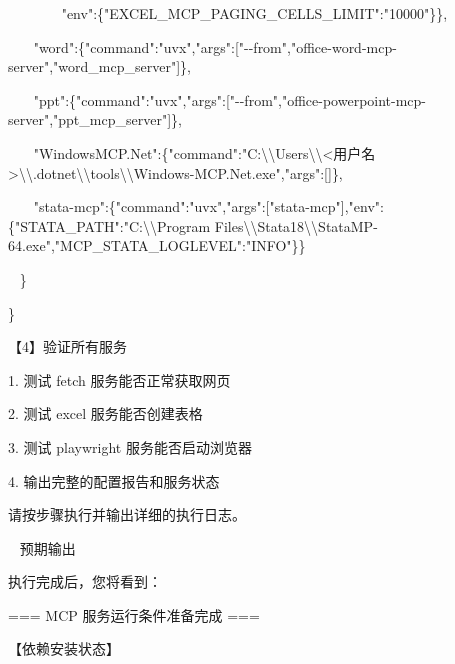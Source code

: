 \documentclass[
  american,
  chinese,
]{ctexart}
\begin{document}
\foreignlanguage{american}{{~~~~~~~ }"env{":\{}"EXCEL\_MCP\_PAGING\_CELLS\_LIMIT":"{10000"\}\}},}

\foreignlanguage{american}{{~~~ }"word{":\{}"command":"{uvx}","{args}{":{[}}"-\/-{from","office}-word-{mcp}-server","{word\_mcp\_server}{"{]}\}},}

\foreignlanguage{american}{{~~~ }"ppt{":\{}"command":"{uvx}","{args}{":{[}}"-\/-from","{office-pow}erpoint-mcp-server","ppt\_mcp\_server{"{]}\}},}

\foreignlanguage{american}{{~~~
}"WindowsMCP.Net":\{"command":"C:\textbackslash\textbackslash Users\textbackslash\textbackslash\textless{}}{用户名}\foreignlanguage{american}{\textgreater\textbackslash\textbackslash.dotnet\textbackslash\textbackslash tools\textbackslash\textbackslash Windows-MCP.Net.exe","{args}":{[}{]}\},}

\foreignlanguage{american}{{~~~ }"{stata}-mcp{":\{}"command":"uvx","args{":{[}}"stata-mcp"{]},"env{":\{}"STATA\_PATH":"C:\textbackslash\textbackslash Program
Files\textbackslash\textbackslash Stata18\textbackslash\textbackslash StataMP-64.exe","MCP\_STATA\_LOGLEVEL":"INFO"\}\}}

\foreignlanguage{american}{{~ }\}}

\foreignlanguage{american}{\}}

{【}\foreignlanguage{american}{4}{】验证所有服务}\foreignlanguage{american}{}

\foreignlanguage{american}{1. }{测试}\foreignlanguage{american}{ fetch }{服务能否正常获取网页}\foreignlanguage{american}{}

\foreignlanguage{american}{2. }{测试}\foreignlanguage{american}{ excel }{服务能否创建表格}\foreignlanguage{american}{}

\foreignlanguage{american}{3. }{测试}\foreignlanguage{american}{ playwright }{服务能否启动浏览器}\foreignlanguage{american}{}

\foreignlanguage{american}{4. }{输出完整的配置报告和服务状态}\foreignlanguage{american}{}

{请按步骤执行并输出详细的执行日志。}\foreignlanguage{american}{}

\foreignlanguage{american}{{~ }}{预期输出}\foreignlanguage{american}{}

{执行完成后，您将看到：}\foreignlanguage{american}{}

\foreignlanguage{american}{=== MCP }{服务运行条件准备完成}\foreignlanguage{american}{ ===}

{【依赖安装状态】}\foreignlanguage{american}{}
\end{document}
